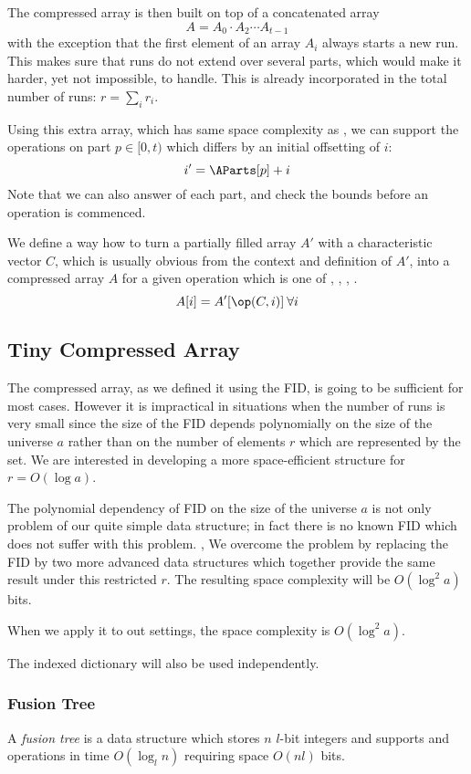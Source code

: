 The compressed array is then built on top of a concatenated array
$$A = A_0 \cdot A_2 \cdots A_{t-1}$$
with the exception that the first element of an array $A_i$ always starts a new run.
This makes sure that runs do not extend over several parts, which would make it harder, yet not impossible, to handle.
This is already incorporated in the total number of runs: $r = \sum_i r_i$.

Using this extra array, which has same space complexity as \ABefore{}, we can support the operations on part $p \in [0, t)$ which differs by an initial offsetting of $i$:
$$i' = \AParts[p] + i$$
Note that we can also answer \size{} of each part, and check the bounds before an operation is commenced.

\bigbreak

We define a way how to turn a partially filled array $A'$ with a characteristic vector $C$, which is usually obvious from the context and definition of $A'$, into a compressed array $A$ for a given operation \op{} which is one of \pred{}, \succ{}, \prev{}, \nextt{}.
$$A[i] = A'[\op(C, i)] \:\forall i$$

\subsection{Tiny Compressed Array}

The compressed array, as we defined it using the FID, is going to be sufficient for most cases.
However it is impractical in situations when the number of runs is very small since the size of the FID depends polynomially on the size of the universe $a$ rather than on the number of elements $r$ which are represented by the set. 
We are interested in developing a more space-efficient structure for $r = O(\log a)$.

The polynomial dependency of FID on the size of the universe $a$ is not only problem of our quite simple data structure; in fact there is no known FID which does not suffer with this problem. \cite{grossi2009more}, \cite{patrascu2008succincter}
We overcome the problem by replacing the FID by two more advanced data structures which together provide the same result under this restricted $r$.
The resulting space complexity will be $O(\log^2 a)$ bits.

When we apply it to out settings, the space complexity is $O(\log^2 a)$.

The indexed dictionary will also be used independently.

\subsubsection{Fusion Tree}
A \emph{fusion tree} is a data structure which stores $n$ $l$-bit integers and supports \pred{} and \succ{} operations in time $O(\log_l n)$ requiring space $O(n l)$ bits. \cite{fredman1993surpassing} \cite{puatracscu2006time}

